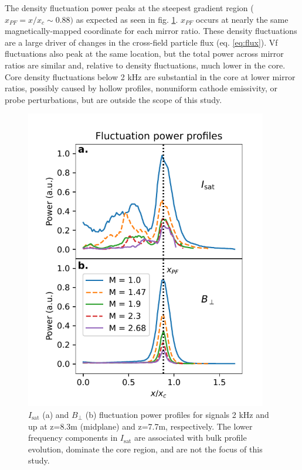 The density fluctuation power peaks at the steepest gradient region ($x_{PF} = x/x_c \sim 0.88)$ as expected as seen in fig. \ref{fig:isat-fluct-prof}. $x_{PF}$ occurs at nearly the same magnetically-mapped coordinate for each mirror ratio. These density fluctuations are a large driver of changes in the cross-field particle flux (eq. \ref{eq:flux}). Vf fluctuations also peak at the same location, but the total power across mirror ratios are similar and, relative to density fluctuations, much lower in the core. Core density fluctuations below 2 kHz are substantial in the core at lower mirror ratios, possibly caused by hollow profiles, nonuniform cathode emissivity, or probe perturbations, but are outside the scope of this study. 
\begin{figure}
    \centering
    \includegraphics[width=300pt]{figures/fig7.pdf}
    \caption[$I_\text{sat}$ and $B_\perp$ fluctuation power profiles]{$I_\text{sat}$ (a) and $B_\perp$ (b) fluctuation power profiles for signals 2 kHz and up at z=8.3m (midplane) and z=7.7m, respectively. The lower frequency components in $I_\text{sat}$ are associated with bulk profile evolution, dominate the core region, and are not the focus of this study.}
    \label{fig:isat-fluct-prof}
\end{figure}

